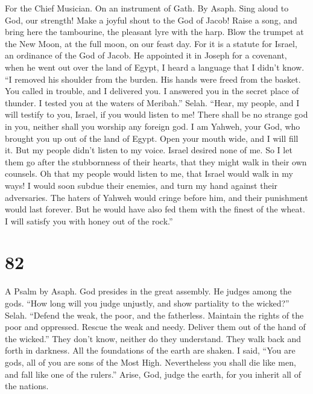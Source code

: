For the Chief Musician. On an instrument of Gath. By Asaph. 
Sing aloud to God, our strength! Make a joyful shout to the God of
Jacob!  Raise a song, and bring here the tambourine, the
pleasant lyre with the harp.  Blow the trumpet at the New
Moon, at the full moon, on our feast day.  For it is a
statute for Israel, an ordinance of the God of Jacob.  He
appointed it in Joseph for a covenant, when he went out over the land of
Egypt, I heard a language that I didn't know.  ``I removed
his shoulder from the burden. His hands were freed from the basket.
 You called in trouble, and I delivered you. I answered you
in the secret place of thunder. I tested you at the waters of Meribah.''
Selah.  ``Hear, my people, and I will testify to you,
Israel, if you would listen to me!  There shall be no
strange god in you, neither shall you worship any foreign god.
 I am Yahweh, your God, who brought you up out of the land
of Egypt. Open your mouth wide, and I will fill it.  But my
people didn't listen to my voice. Israel desired none of me.
 So I let them go after the stubbornness of their hearts,
that they might walk in their own counsels.  Oh that my
people would listen to me, that Israel would walk in my ways!
 I would soon subdue their enemies, and turn my hand
against their adversaries.  The haters of Yahweh would
cringe before him, and their punishment would last forever.
 But he would have also fed them with the finest of the
wheat. I will satisfy you with honey out of the rock.''

\hypertarget{section-72}{%
\section{82}\label{section-72}}

A Psalm by Asaph.  God presides in the great assembly. He
judges among the gods.  ``How long will you judge unjustly,
and show partiality to the wicked?'' Selah.  ``Defend the
weak, the poor, and the fatherless. Maintain the rights of the poor and
oppressed.  Rescue the weak and needy. Deliver them out of
the hand of the wicked.''  They don't know, neither do they
understand. They walk back and forth in darkness. All the foundations of
the earth are shaken.  I said, ``You are gods, all of you
are sons of the Most High.  Nevertheless you shall die like
men, and fall like one of the rulers.''  Arise, God, judge
the earth, for you inherit all of the nations.

